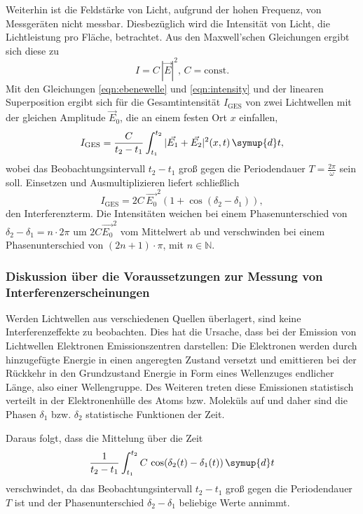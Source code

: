 Weiterhin ist die Feldstärke von Licht, aufgrund der hohen Frequenz, von
Messgeräten nicht messbar. Diesbezüglich wird die Intensität von Licht, die Lichtleistung pro 
Fläche, betrachtet.
Aus den Maxwell'schen Gleichungen ergibt sich diese zu
\begin{equation}
	\label{eqn:intensity}
	I = C \, |\vec{E}|^2 \mathrm{, } \, C = \mathrm{const.}
\end{equation}
Mit den Gleichungen \eqref{eqn:ebenewelle} und \eqref{eqn:intensity} und der linearen 
Superposition ergibt sich für die Gesamtintensität $I_{\mathrm{GES}}$ von zwei Lichtwellen mit 
der gleichen Amplitude $\vec{E}_0$, die an einem festen Ort $x$ einfallen,
\begin{equation}
	I_{\mathrm{GES}} = \frac{C}{t_2 - t_1} \int_{t_1}^{t_2} |\vec{E_1} + \vec{E_2}|^2(x,t) \,  \symup{d}t \mathrm{,}
\end{equation}
wobei das Beobachtungsintervall $t_2 - t_1$ groß gegen die Periodendauer $T=\frac{2\pi}{\omega}$
sein soll.
Einsetzen und Ausmultiplizieren liefert schließlich
\begin{equation}
	I_{\mathrm{GES}} = 2C \, \vec{E_0}^2 (1+\cos(\delta_2 - \delta_1)) \mathrm{,}
\end{equation}
den Interferenzterm. Die Intensitäten weichen bei einem Phasenunterschied von
$\delta_2 - \delta_1 = n \cdot 2\pi$ um $2C \vec{E_0}^2$ vom Mittelwert ab und verschwinden
bei einem Phasenunterschied von $(2n+1) \cdot \pi$, mit $n \in \mathbb{N}$.


\subsubsection{Diskussion über die Voraussetzungen zur Messung von Interferenzerscheinungen}
\label{sec:messunginterferenz}

Werden Lichtwellen aus verschiedenen Quellen überlagert, sind keine Interferenzeffekte zu 
beobachten. Dies hat die Ursache, dass bei der Emission von Lichtwellen Elektronen 
Emissionszentren darstellen: Die Elektronen werden durch hinzugefügte Energie in einen 
angeregten Zustand versetzt und emittieren bei der Rückkehr in den Grundzustand Energie in Form 
eines Wellenzuges endlicher Länge, also einer Wellengruppe. Des Weiteren treten diese Emissionen 
statistisch verteilt in der Elektronenhülle des Atoms bzw. Moleküls auf und daher sind die Phasen
$\delta_1$ bzw. $\delta_2$ statistische Funktionen der Zeit. 

Daraus folgt, dass die Mittelung über die Zeit
\begin{equation}
	\frac{1}{t_2-t_1} \int_{t_1}^{t_2} C \, \cos(\delta_2(t)-\delta_1(t)) \, \symup{d}t
\end{equation}
verschwindet, da das Beobachtungsintervall $t_2-t_1$ groß gegen die Periodendauer $T$ ist und 
der Phasenunterschied $\delta_2-\delta_1$ beliebige Werte annimmt.


